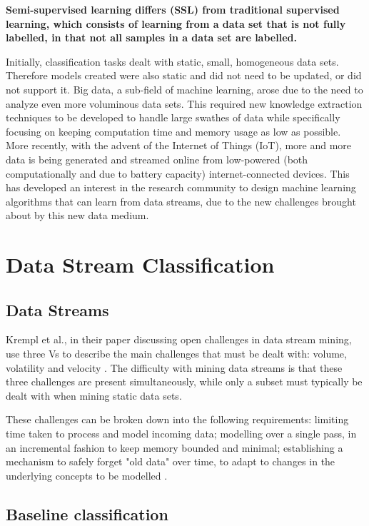 \textbf{Semi-supervised learning differs (SSL) from traditional supervised learning, which consists of learning from a data set that is not fully labelled, in that not all samples in a data set are labelled.}

Initially, classification tasks dealt with static, small, homogeneous data sets. Therefore models created were also static and did not need to be updated, or did not support it. 
Big data, a sub-field of machine learning, arose due to the need to analyze even more voluminous data sets. This required new knowledge extraction techniques to be developed to handle large swathes of data while specifically focusing on keeping computation time and memory usage as low as possible.
More recently, with the advent of the Internet of Things (IoT), more and more data is being generated and streamed online from low-powered (both computationally and due to battery capacity) internet-connected devices. This has developed an interest in the research community to design machine learning algorithms that can learn from data streams, due to the new challenges brought about by this new data medium.

\section{Data Stream Classification}
\subsection{Data Streams}
Krempl et al., in their paper discussing open challenges in data stream mining, use three Vs to describe the main challenges that must be dealt with: volume, volatility and velocity \cite{krempl2014open}. The difficulty with mining data streams is that these three challenges are present simultaneously, while only a subset must typically be dealt with when mining static data sets.

These challenges can be broken down into the following requirements: limiting time taken to process and model incoming data; modelling over a single pass, in an incremental fashion to keep memory bounded and minimal; establishing a mechanism to safely forget "old data" over time, to adapt to changes in the underlying concepts to be modelled \cite{gama2010knowledge, gama2014survey, ghesmoune2016state, KRAWCZYK2017132, krempl2014open, silva2013data, widmer1996learning}.

\subsection{Baseline classification}
